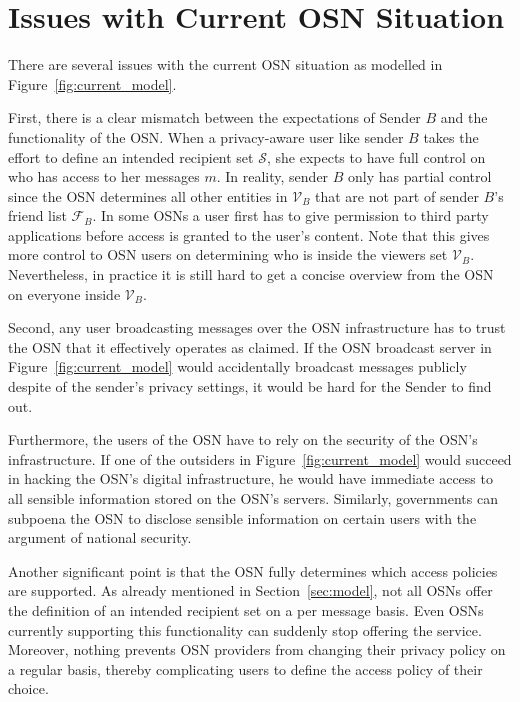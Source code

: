 \section{Issues with Current OSN Situation}
\label{sec:problem_statement}
There are several issues with the current OSN situation as modelled in Figure~\ref{fig:current_model}.

First, there is a clear mismatch between the expectations of Sender $B$ and the functionality of the OSN. When a privacy-aware user like sender $B$ takes the effort to define an intended recipient set $\mathcal{S}$, she expects to have full control on who has access to her messages $m$. In reality, sender $B$ only has partial control since the OSN determines all other entities in $\mathcal{V}_B$ that are not part of sender $B$'s friend list $\mathcal{F}_B$. In some OSNs a user first has to give permission to third party applications before access is granted to the user's content. Note that this gives more control to OSN users on determining who is inside the viewers set $\mathcal{V}_B$. Nevertheless, in practice it is still hard to get a concise overview from the OSN on everyone inside $\mathcal{V}_B$.

Second, any user broadcasting messages over the OSN infrastructure has to trust the OSN that it effectively operates as claimed. If the OSN broadcast server in Figure~\ref{fig:current_model} would accidentally broadcast messages publicly despite of the sender's privacy settings, it would be hard for the Sender to find out.

Furthermore, the users of the OSN have to rely on the security of the OSN's infrastructure. If one of the outsiders in Figure~\ref{fig:current_model} would succeed in hacking the OSN's digital infrastructure, he would have immediate access to all sensible information stored on the OSN's servers. Similarly, governments can subpoena the OSN to disclose sensible information on certain users with the argument of national security.

Another significant point is that the OSN fully determines which access policies are supported. As already mentioned in Section~\ref{sec:model}, not all OSNs offer the definition of an intended recipient set on a per message basis. Even OSNs currently supporting this functionality can suddenly stop offering the service. Moreover, nothing prevents OSN providers from changing their privacy policy on a regular basis, thereby complicating users to define the access policy of their choice.

